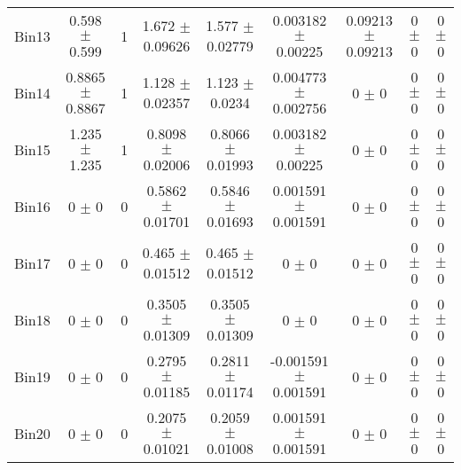\begin{tabular}{@{\extracolsep{4pt}}lcccccccc@{}}
     Bin13 & 0.598 $\pm$ 0.599 & 1 & 1.672 $\pm$ 0.09626 & 1.577 $\pm$ 0.02779 & 0.003182 $\pm$ 0.00225 & 0.09213 $\pm$ 0.09213 & 0 $\pm$ 0 & 0 $\pm$ 0 \\ 
     Bin14 & 0.8865 $\pm$ 0.8867 & 1 & 1.128 $\pm$ 0.02357 & 1.123 $\pm$ 0.0234 & 0.004773 $\pm$ 0.002756 & 0 $\pm$ 0 & 0 $\pm$ 0 & 0 $\pm$ 0 \\ 
     Bin15 & 1.235 $\pm$ 1.235 & 1 & 0.8098 $\pm$ 0.02006 & 0.8066 $\pm$ 0.01993 & 0.003182 $\pm$ 0.00225 & 0 $\pm$ 0 & 0 $\pm$ 0 & 0 $\pm$ 0 \\ 
     Bin16 & 0 $\pm$ 0 & 0 & 0.5862 $\pm$ 0.01701 & 0.5846 $\pm$ 0.01693 & 0.001591 $\pm$ 0.001591 & 0 $\pm$ 0 & 0 $\pm$ 0 & 0 $\pm$ 0 \\ 
     Bin17 & 0 $\pm$ 0 & 0 & 0.465 $\pm$ 0.01512 & 0.465 $\pm$ 0.01512 & 0 $\pm$ 0 & 0 $\pm$ 0 & 0 $\pm$ 0 & 0 $\pm$ 0 \\ 
     Bin18 & 0 $\pm$ 0 & 0 & 0.3505 $\pm$ 0.01309 & 0.3505 $\pm$ 0.01309 & 0 $\pm$ 0 & 0 $\pm$ 0 & 0 $\pm$ 0 & 0 $\pm$ 0 \\ 
     Bin19 & 0 $\pm$ 0 & 0 & 0.2795 $\pm$ 0.01185 & 0.2811 $\pm$ 0.01174 & -0.001591 $\pm$ 0.001591 & 0 $\pm$ 0 & 0 $\pm$ 0 & 0 $\pm$ 0 \\ 
     Bin20 & 0 $\pm$ 0 & 0 & 0.2075 $\pm$ 0.01021 & 0.2059 $\pm$ 0.01008 & 0.001591 $\pm$ 0.001591 & 0 $\pm$ 0 & 0 $\pm$ 0 & 0 $\pm$ 0 \\ 
\hline\hline
  \end{tabular}

